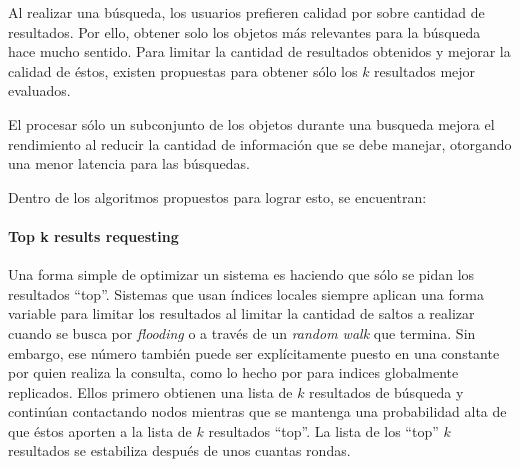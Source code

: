


Al realizar una búsqueda, los usuarios prefieren calidad por sobre cantidad de
resultados. Por ello, obtener solo los objetos más relevantes para la
búsqueda hace mucho sentido. %
Para limitar la cantidad de resultados obtenidos y mejorar la calidad de éstos,
existen propuestas para obtener sólo los $k$ resultados mejor evaluados.

El procesar sólo un subconjunto de los objetos durante una busqueda mejora el
rendimiento al reducir la cantidad de información que se debe manejar, otorgando
una menor latencia para las búsquedas.

Dentro de los algoritmos propuestos para lograr esto, se encuentran:



%

\paragraph{Top k results requesting} %
Una forma simple de optimizar un sistema es haciendo que sólo se pidan los
resultados ``top''. Sistemas que usan índices locales siempre aplican una forma
variable para limitar los resultados al limitar la cantidad de saltos a realizar
cuando se busca por \textit{flooding} o a través de un \textit{random walk} que
termina. Sin embargo, ese número también puede ser explícitamente puesto en una
constante por quien realiza la consulta, como lo hecho por %
para indices globalmente replicados. Ellos primero obtienen una lista de $k$
resultados de búsqueda y continúan contactando nodos mientras que se mantenga una
probabilidad alta de que éstos aporten a la lista de $k$ resultados ``top''. La lista de
los ``top'' $k$ resultados se estabiliza después de unos cuantas rondas.

